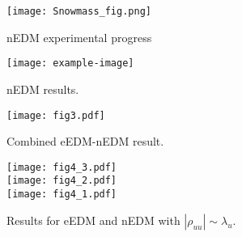 \begin{figure}[p]
    \centering
    \texttt{[image: Snowmass\_fig.png]}
    \caption{nEDM experimental progress~\cite{Snowmass2022EDM}}
    \label{fig:snowmass}
\end{figure}

\begin{figure}[p]
    \centering
    \begin{minipage}{0.48\textwidth}
      \centering
      \texttt{[image: example-image]}
      \caption{nEDM results.}
      \label{fig:nEDM-fixed}
    \end{minipage}\hfill
    \begin{minipage}{0.48\textwidth}
      \centering
      \texttt{[image: fig3.pdf]}
      \caption{Combined eEDM-nEDM result.}
      \label{fig:nEDM-eEDM}
    \end{minipage}
\end{figure}

\begin{figure}[p]
    \centering
    \texttt{[image: fig4\_3.pdf]}\\
    \texttt{[image: fig4\_2.pdf]}\\
    \texttt{[image: fig4\_1.pdf]}
    \caption{Results for eEDM and nEDM with \(|\rho_{uu}| \sim \lambda_{u}\).}
    \label{fig:nEDM-varied}
\end{figure}